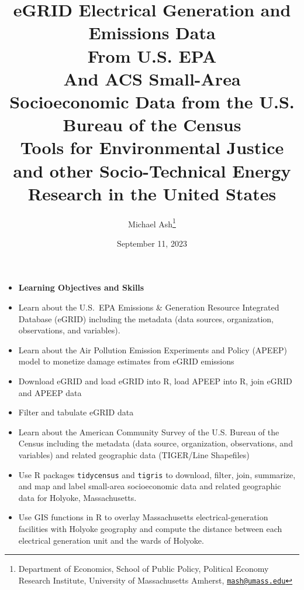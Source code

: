 \documentclass[fleqn, 12pt]{exam}
\title{eGRID Electrical Generation and Emissions Data\\ From U.S. EPA\\ And ACS Small-Area Socioeconomic Data from the U.S. Bureau of the Census\\
Tools for Environmental Justice and other Socio-Technical Energy Research in the United States}
\author{Michael Ash\thanks{Department of Economics, School of Public Policy, Political Economy Research Institute, University of Massachusetts Amherst, \href{mailto:mash@umass.edu}{\tt mash@umass.edu}}}
\date{September 11, 2023}
\begin{document}
\maketitle
\thispagestyle{empty}

\begin{center}
\end{center}


  \begin{itemize}
  \item \textbf{Learning Objectives and Skills}
  \item Learn about the U.S.~EPA Emissions \& Generation Resource Integrated Database (eGRID) including the metadata (data sources, organization, observations, and variables).
  \item Learn about the Air Pollution Emission Experiments and Policy (APEEP) model to monetize damage estimates from eGRID emissions
  \item Download eGRID and load eGRID into R, load APEEP into R, join eGRID and APEEP data
  \item Filter and tabulate eGRID data
  \item Learn about the American Community Survey of the U.S. Bureau of the Census including the metadata (data source, organization, observations, and variables) and related geographic data (TIGER/Line Shapefiles)
  \item Use R packages \texttt{tidycensus} and \texttt{tigris} to download, filter, join, summarize, and map and label small-area socioeconomic data and related geographic data for Holyoke, Massachusetts. 
  \item Use GIS functions in R to overlay Massachusetts electrical-generation facilities with Holyoke geography and compute the distance between each electrical generation unit and the wards of Holyoke. 
  \end{itemize}
\end{document}
